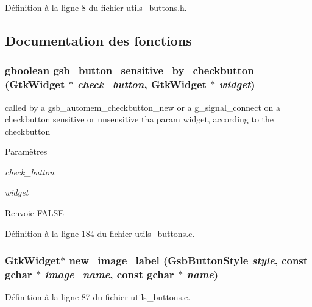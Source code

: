 Définition à la ligne 8 du fichier utils\_\-buttons.h.



\subsection{Documentation des fonctions}
\subsubsection[{gsb\_\-button\_\-sensitive\_\-by\_\-checkbutton}]{\setlength{\rightskip}{0pt plus 5cm}gboolean gsb\_\-button\_\-sensitive\_\-by\_\-checkbutton (GtkWidget $\ast$ {\em check\_\-button}, \/  GtkWidget $\ast$ {\em widget})}\label{utils__buttons_8h_ad3fabcee0e67c73921725cf708b29be1}
called by a gsb\_\-automem\_\-checkbutton\_\-new or a g\_\-signal\_\-connect on a checkbutton sensitive or unsensitive tha param widget, according to the checkbutton


\begin{DoxyParams}{Paramètres}
\item[{\em check\_\-button}]\item[{\em widget}]\end{DoxyParams}
\begin{DoxyReturn}{Renvoie}
FALSE 
\end{DoxyReturn}


Définition à la ligne 184 du fichier utils\_\-buttons.c.

\subsubsection[{new\_\-image\_\-label}]{\setlength{\rightskip}{0pt plus 5cm}GtkWidget$\ast$ new\_\-image\_\-label ({\bf GsbButtonStyle} {\em style}, \/  const gchar $\ast$ {\em image\_\-name}, \/  const gchar $\ast$ {\em name})}\label{utils__buttons_8h_ad3b9b13c8568d4b884cac0d402d54c3c}


Définition à la ligne 87 du fichier utils\_\-buttons.c.

